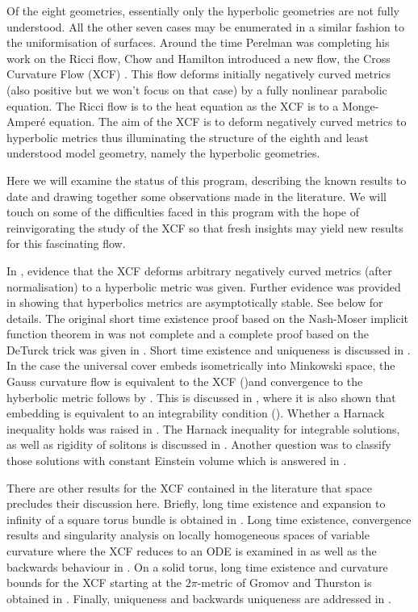\documentclass[a4paper,12pt]{amsart}
\begin{document}
Of the eight geometries, essentially only the hyperbolic geometries are not fully understood. All the other seven cases may be enumerated in a similar fashion to the uniformisation of surfaces. Around the time Perelman was completing his work on the Ricci flow, Chow and Hamilton introduced a new flow, the Cross Curvature Flow (XCF) \cite{MR2055396}. This flow deforms initially negatively curved metrics (also positive but we won't focus on that case) by a fully nonlinear parabolic equation. The Ricci flow is to the heat equation as the XCF is to a Monge-Amper\'e equation. The aim of the XCF is to deform negatively curved metrics to hyperbolic metrics thus illuminating the structure of the eighth and least understood model geometry, namely the hyperbolic geometries.

Here we will examine the status of this program, describing the known results to date and drawing together some observations made in the literature. We will touch on some of the difficulties faced in this program with the hope of reinvigorating the study of the XCF so that fresh insights may yield new results for this fascinating flow.

In \cite{MR2055396}, evidence that the XCF deforms arbitrary negatively curved metrics (after normalisation) to a hyperbolic metric was given. Further evidence was provided in \cite{MR2448593} showing that hyperbolics metrics are asymptotically stable. See  below for details. The original short time existence proof based on the Nash-Moser implicit function theorem in \cite{MR2055396} was not complete and a complete proof based on the DeTurck trick was given in \cite{MR2207496}. Short time existence and uniqueness is discussed in . In the case the universal cover embeds isometrically into Minkowski space, the Gauss curvature flow is equivalent to the XCF ()and convergence to the hyberbolic metric follows by \cite{MR3344442}. This is discussed in , where it is also shown that embedding is equivalent to an integrability condition (). Whether a Harnack inequality holds was raised in \cite{MR2055396}. The Harnack inequality for integrable solutions, as well as rigidity of solitons is discussed in . Another question was to classify those solutions with constant Einstein volume which is answered in .

There are other results for the XCF contained in the literature that space precludes their discussion here. Briefly, long time existence and expansion to infinity of a square torus bundle is obtained in \cite{MR2222245}. Long time existence, convergence results and singularity analysis on locally homogeneous spaces of variable curvature where the XCF reduces to an ODE is examined in \cite{MR2407107,MR2653711,MR2426751} as well as the backwards behaviour in \cite{MR2601352}. On a solid torus, long time existence and curvature bounds for the XCF starting at the \(2\pi\)-metric of Gromov and Thurston is obtained in \cite{MR2602839}. Finally, uniqueness and backwards uniqueness are addressed in \cite{MR3575926,MR3544962}.
\end{document}
